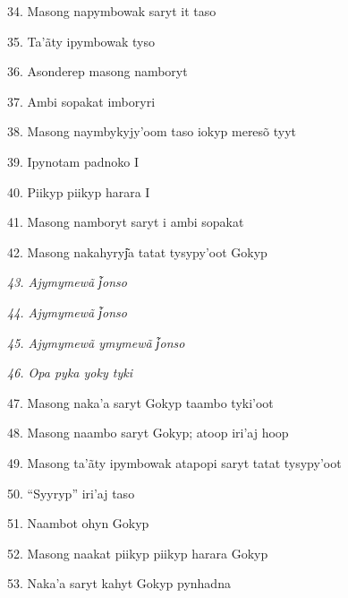 34. Masong napymbowak saryt it taso

35. Ta'ãty ipymbowak tyso

36. Asonderep masong namboryt

37. Ambi sopakat imboryri

38. Masong naymbykyjy'oom taso iokyp meresõ tyyt

39. Ipynotam padnoko I

40. Piikyp piikyp harara I

41. Masong namboryt saryt i ambi sopakat

42. Masong nakahyryj͂a tatat tysypy'oot Gokyp

\emph{43. Ajymymewã j͂onso}

\emph{44. Ajymymewã j͂onso}

\emph{45. Ajymymewã ymymewã j͂onso}

\emph{46. Opa pyka yoky tyki}

47. Masong naka'a saryt Gokyp taambo tyki'oot

48. Masong naambo saryt Gokyp; atoop iri'aj hoop

49. Masong ta'ãty ipymbowak atapopi saryt tatat tysypy'oot

50. ``Syyryp'' iri'aj taso

51. Naambot ohyn Gokyp

52. Masong naakat piikyp piikyp harara Gokyp

53. Naka'a saryt kahyt Gokyp pynhadna